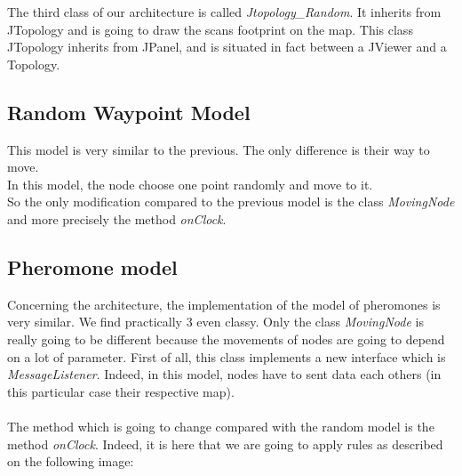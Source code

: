 The third class of our architecture is called \textit{Jtopology\_Random}. It inherits from JTopology and is going to draw the scans footprint on the map. This class JTopology inherits from JPanel, and is situated in fact between a JViewer and a Topology.

\subsection{Random Waypoint Model}

This model is very similar to the previous. The only difference is their way to move.\\
In this model, the node choose one point randomly and move to it.\\
So the only modification compared to the previous model is the class \textit{MovingNode} and more precisely the method \textit{onClock}.

\subsection{Pheromone model}

Concerning the architecture, the implementation of the model of pheromones is very similar. We find practically 3 even classy. Only the class \textit{MovingNode} is really going to be different because the movements of nodes are going to depend on a lot of parameter. First of all, this class implements a new interface which is \textit{MessageListener}. Indeed, in this model, nodes have to sent data each others (in this particular case their respective map).\\\\

The method which is going to change compared with the random model is the method \textit{onClock}. Indeed, it is here that we are going to apply rules as described on the following image:

